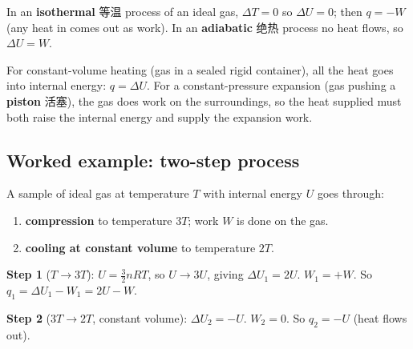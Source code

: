 \documentclass[11pt]{article}
\begin{document}
\begin{center}
\end{center}

In an \textbf{isothermal} 等温 process of an ideal gas, $\Delta T = 0$ so $\Delta U = 0$; then $q = -W$ (any heat in comes out as work). In an \textbf{adiabatic} 绝热 process no heat flows, so $\Delta U = W$.

For constant-volume heating (gas in a sealed rigid container), all the heat goes into internal energy: $q = \Delta U$. For a constant-pressure expansion (gas pushing a \textbf{piston} 活塞), the gas does work on the surroundings, so the heat supplied must both raise the internal energy and supply the expansion work.

\subsection*{Worked example: two-step process}

A sample of ideal gas at temperature $T$ with internal energy $U$ goes through:

\begin{enumerate}
\item \textbf{compression} to temperature $3T$; work $W$ is done on the gas.

\item \textbf{cooling at constant volume} to temperature $2T$.

\end{enumerate}

\textbf{Step 1} ($T \to 3T$): $U = \tfrac{3}{2}nRT$, so $U \to 3U$, giving $\Delta U_{1} = 2U$. $W_{1} = +W$. So $q_{1} = \Delta U_{1} - W_{1} = 2U - W$.

\textbf{Step 2} ($3T \to 2T$, constant volume): $\Delta U_{2} = -U$. $W_{2} = 0$. So $q_{2} = -U$ (heat flows out).
\end{document}
